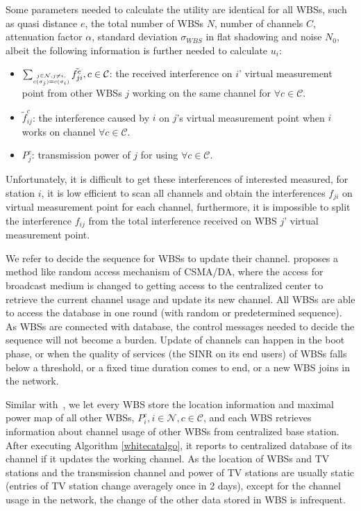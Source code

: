 Some parameters needed to calculate the utility are identical for all WBSs, such as quasi distance $e$, the total number of WBSs $N$, number of channels $C$, attenuation factor $\alpha$, standard deviation $\sigma_{WBS}$ in flat shadowing and noise $N_0$, albeit the following information is further needed to calculate $u_i$: 
	\begin{itemize} %
	\item $\sum_{\tiny\substack{j\in \mathcal{N}, j\ne i,\\ c(\sigma_j)=c(\sigma_i)}}\tilde{f_{ji}^c}, c\in \mathcal{C}$: the received interference on $i$' virtual measurement point from other WBSs $j$ working on the same channel for $\forall c\in \mathcal{C}$.
	\item $\tilde f_{ij}^c$: the interference caused by $i$ on $j$'s virtual measurement point when $i$ works on channel $\forall c\in \mathcal{C}$.
	\item $P_j^c$: transmission power of $j$ for using $\forall c\in \mathcal{C}$.
	\end{itemize}
Unfortunately, it is difficult to get these interferences of interested measured, for station $i$, it is low efficient to scan all channels and obtain the interferences $f_{ji}$ on virtual measurement point for each channel, furthermore, it is impossible to split the interference $f_{ij}$ from the total interference received on WBS $j$' virtual measurement point. 

We refer \cite{CApotentialLearning_05dyspan} to decide the sequence for WBSs to update their channel. \cite{CApotentialLearning_05dyspan} proposes a method like random access mechanism of CSMA/DA, where the access for broadcast medium is changed to getting access to the centralized center to retrieve the current channel usage and update its new channel. All WBSs are able to access the database in one round (with random or predetermined sequence). As WBSs are connected with database, the control messages needed to decide the sequence will not become a burden. Update of channels can happen in the boot phase, or when the quality of services (the SINR on its end users) of WBSs falls below a threshold, or a fixed time duration comes to end, or a new WBS joins in the network. 

Similar with~\cite{SenseLess2011}, we let every WBS store the location information and maximal power map of all other WBSs, \ie $P_i^c, i\in\mathcal{N}, c\in\mathcal{C}$, and each WBS retrieves information about channel usage of other WBSs from centralized base station.
After executing Algorithm \ref{whitecatalgo}, it reports to centralized database of its channel if it updates the working channel.
As the location of WBSs and TV stations and the transmission channel and power of TV stations are usually static (entries of TV station change averagely once in 2 days\cite{SenseLess2011}), except for the channel usage in the network, the change of the other data stored in WBS is infrequent. 


